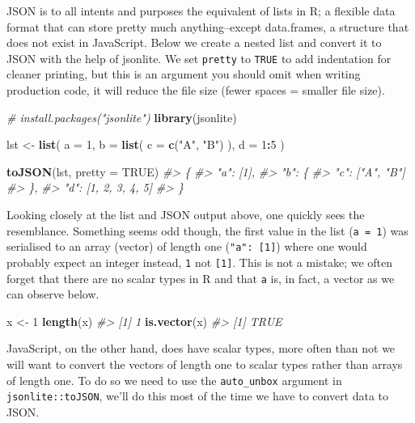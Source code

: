 \documentclass[
]{krantz}
\makeatletter
\newenvironment{Shaded}{\begin{snugshade}}{\end{snugshade}}
\newcommand{\CommentTok}[1]{\textcolor[rgb]{0.37,0.37,0.37}{\textit{#1}}}
\newcommand{\DataTypeTok}[1]{\textcolor[rgb]{0.27,0.27,0.27}{#1}}
\newcommand{\DecValTok}[1]{\textcolor[rgb]{0.06,0.06,0.06}{#1}}
\newcommand{\KeywordTok}[1]{\textcolor[rgb]{0.27,0.27,0.27}{\textbf{#1}}}
\newcommand{\NormalTok}[1]{#1}
\newcommand{\OperatorTok}[1]{\textcolor[rgb]{0.43,0.43,0.43}{\textbf{#1}}}
\newcommand{\OtherTok}[1]{\textcolor[rgb]{0.37,0.37,0.37}{#1}}
\newcommand{\StringTok}[1]{\textcolor[rgb]{0.5,0.5,0.5}{#1}}
\newenvironment{kframe}{%
\medskip{}
\setlength{\fboxsep}{.8em}
 \def\at@end@of@kframe{}%
 \ifinner\ifhmode%
  \def\at@end@of@kframe{\end{minipage}}%
  \begin{minipage}{\columnwidth}%
 \fi\fi%
 \def\FrameCommand##1{\hskip\@totalleftmargin \hskip-\fboxsep
 \colorbox{shadecolor}{##1}\hskip-\fboxsep
     \hskip-\linewidth \hskip-\@totalleftmargin \hskip\columnwidth}%
 \MakeFramed {\advance\hsize-\width
   \@totalleftmargin\z@ \linewidth\hsize
   \@setminipage}}%
 {\par\unskip\endMakeFramed%
 \at@end@of@kframe}
\renewenvironment{Shaded}{\begin{kframe}}{\end{kframe}}
\makeatother
\begin{document}
JSON is to all intents and purposes the equivalent of lists in R; a flexible data format that can store pretty much anything--except data.frames, a structure that does not exist in JavaScript. Below we create a nested list and convert it to JSON with the help of jsonlite. We set \texttt{pretty} to \texttt{TRUE} to add indentation for cleaner printing, but this is an argument you should omit when writing production code, it will reduce the file size (fewer spaces = smaller file size).

\begin{Shaded}
\begin{Highlighting}[]
\CommentTok{\# install.packages("jsonlite")}
\KeywordTok{library}\NormalTok{(jsonlite)}

\NormalTok{lst <{-}}\StringTok{ }\KeywordTok{list}\NormalTok{(}
  \DataTypeTok{a =} \DecValTok{1}\NormalTok{,}
  \DataTypeTok{b =} \KeywordTok{list}\NormalTok{(}
    \DataTypeTok{c =} \KeywordTok{c}\NormalTok{(}\StringTok{"A"}\NormalTok{, }\StringTok{"B"}\NormalTok{)}
\NormalTok{  ),}
  \DataTypeTok{d =} \DecValTok{1}\OperatorTok{:}\DecValTok{5}
\NormalTok{)}

\KeywordTok{toJSON}\NormalTok{(lst, }\DataTypeTok{pretty =} \OtherTok{TRUE}\NormalTok{)}
\CommentTok{\#> \{}
\CommentTok{\#>   "a": [1],}
\CommentTok{\#>   "b": \{}
\CommentTok{\#>     "c": ["A", "B"]}
\CommentTok{\#>   \},}
\CommentTok{\#>   "d": [1, 2, 3, 4, 5]}
\CommentTok{\#> \}}
\end{Highlighting}
\end{Shaded}

Looking closely at the list and JSON output above, one quickly sees the resemblance. Something seems odd though, the first value in the list (\texttt{a\ =\ 1}) was serialised to an array (vector) of length one (\texttt{"a":\ {[}1{]}}) where one would probably expect an integer instead, \texttt{1} not \texttt{{[}1{]}}. This is not a mistake; we often forget that there are no scalar types in R and that \texttt{a} is, in fact, a vector as we can observe below.

\begin{Shaded}
\begin{Highlighting}[]
\NormalTok{x <{-}}\StringTok{ }\DecValTok{1}
\KeywordTok{length}\NormalTok{(x)}
\CommentTok{\#> [1] 1}
\KeywordTok{is.vector}\NormalTok{(x)}
\CommentTok{\#> [1] TRUE}
\end{Highlighting}
\end{Shaded}

JavaScript, on the other hand, does have scalar types, more often than not we will want to convert the vectors of length one to scalar types rather than arrays of length one. To do so we need to use the \texttt{auto\_unbox} argument in \texttt{jsonlite::toJSON}, we'll do this most of the time we have to convert data to JSON.
\end{document}
